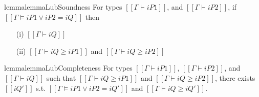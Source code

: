 \begin{restatable}{lemma}{lemmaLubSoundness}
    \label{lemma:lub-soundness}
    For types $[[Γ ⊢ iP1]]$, and $[[Γ ⊢ iP2]]$,
    if $[[Γ ⊨ iP1 ∨ iP2 = iQ]]$ then
    \begin{enumerate}
        \item[(i)]  $[[Γ ⊢ iQ]]$
        \item[(ii)] $[[Γ ⊢ iQ ≥ iP1]]$ and $[[Γ ⊢ iQ ≥ iP2]]$
    \end{enumerate}
\end{restatable}

\begin{restatable}{lemma}{lemmaLubCompleteness}
    \label{lemma:lub-completeness}
    For types $[[Γ ⊢ iP1]]$, $[[Γ ⊢ iP2]]$, and $[[Γ ⊢ iQ]]$
    such that $[[Γ ⊢ iQ ≥ iP1]]$ and $[[Γ ⊢ iQ ≥ iP2]]$,
    there exists $[[iQ']]$ s.t. $[[Γ ⊨ iP1 ∨ iP2 = iQ']]$ 
    and $[[Γ ⊢ iQ ≥ iQ']]$.
\end{restatable}

